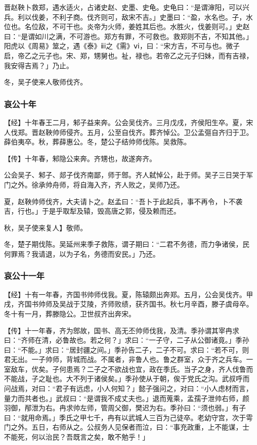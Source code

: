 \documentclass[]{article}
\begin{document}
晋赵鞅卜救郑，遇水适火，占诸史赵、史墨、史龟。史龟曰：``是谓渖阳，可以兴兵。利以伐姜，不利子商。伐齐则可，敌宋不吉。」史墨曰：``盈，水名也。子，水位也。名位敌，不可干也。炎帝为火师，姜姓其后也。水胜火，伐姜则可。」史赵曰：``是谓如川之满，不可游也。郑方有罪，不可救也。救郑则不吉，不知其他。」阳虎以《周易》筮之，遇《泰》ⅱⅰ之《需》ⅴⅰ，曰：``宋方吉，不可与也。微子启，帝乙之元子也。宋、郑，甥舅也。祉，禄也。若帝乙之元子归妹，而有吉禄，我安得吉焉？」乃止。

冬，吴子使来人敬师伐齐。

\hypertarget{header-n3145}{%
\subsubsection{哀公十年}\label{header-n3145}}

【经】十年春王二月，邾子益来奔。公会吴伐齐。三月戊戌，齐侯阳生卒。夏，宋人伐郑。晋赵鞅帅师侵齐。五月，公至自伐齐。葬齐悼公。卫公孟彄自齐归于卫。薛伯夷卒。秋，葬薛惠公。冬，楚公子结帅师伐陈。吴救陈。

【传】十年春，邾隐公来奔。齐甥也，故遂奔齐。

公会吴子、邾子、郯子伐齐南鄙，师于鄎。齐人弑悼公，赴于师。吴子三日哭于军门之外。徐承帅舟师，将自海入齐，齐人败之，吴师乃还。

夏，赵鞅帅师伐齐，大夫请卜之。赵孟曰：``吾卜于此起兵，事不再令，卜不袭吉，行也。」于是乎取犁及辕，毁高唐之郭，侵及赖而还。

秋，吴子使来复人】敬师。

冬，楚子期伐陈。吴延州来季子救陈，谓子期曰：``二君不务德，而力争诸侯，民何罪焉？我请退，以为子名，务德而安民。」乃还。

\hypertarget{header-n3154}{%
\subsubsection{哀公十一年}\label{header-n3154}}

【经】十有一年春，齐国书帅师伐我。夏，陈辕颇出奔郑。五月，公会吴伐齐。甲戌，齐国书帅师及吴战于艾陵，齐师败绩，获齐国书。秋七月辛酉，滕子虞母卒。冬十有一月，葬滕隐公。卫世叔齐出奔宋。

【传】十一年春，齐为鄎故，国书、高无丕帅师伐我，及清。季孙谓其宰冉求曰：``齐师在清，必鲁故也。若之何？」求曰：``一子守，二子从公御诸竟。」季孙曰：``不能。」求曰：``居封疆之间。」季孙告二子，二子不可。求曰：``若不可，则君无出。一子帅师，背城而战。不属者，非鲁人也。鲁之群室，众于齐之兵车。一室敌车，优矣。子何患焉？二子之不欲战也宜，政在季氏。当子之身，齐人伐鲁而不能战，子之耻也。大不列于诸侯矣。」季孙使从于朝，俟于党氏之沟。武叔呼而问战焉，对曰：``君子有远虑，小人何知？」懿子强问之，对曰：``小人虑材而言，量力而共者也。」武叔曰：``是谓我不成丈夫也。」退而蒐乘，孟孺子泄帅右师，颜羽御，邴泄为右。冉求帅左师，管周父御，樊迟为右。季孙曰：``须也弱。」有子曰：``就用命焉。」季氏之甲七千，冉有以武城人三百为己徒卒。老幼守宫，次于雩门之外。五日，右师从之。公叔务人见保者而泣，曰：``事充政重，上不能谋，士不能死，何以治民？吾既言之矣，敢不勉乎！」
\end{document}
